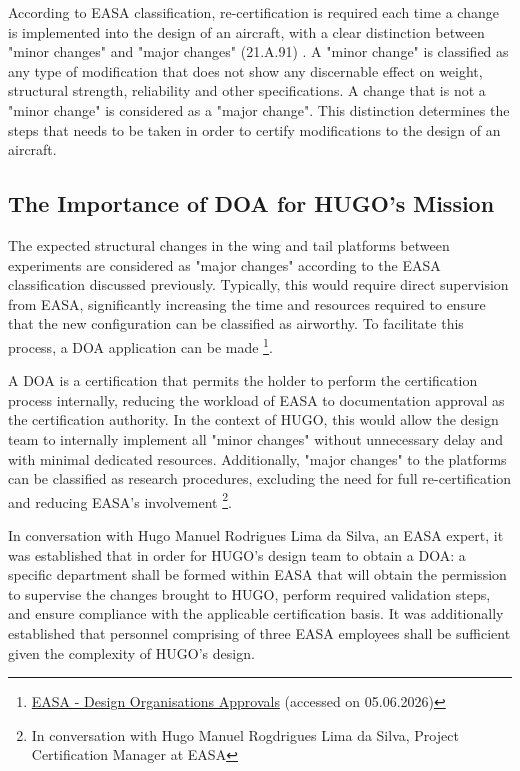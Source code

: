 According to EASA classification, re-certification is required each time a change is implemented into the design of an aircraft, with a clear distinction between "minor changes" and "major changes"
(21.A.91) \cite{EASAInitialAirworthiness2025}. A "minor change" is classified as any type of modification that does not show any discernable effect on weight, structural strength, reliability and other specifications. A change that is not a "minor change" is considered as a "major change". This distinction determines the steps that needs to be taken in order to certify modifications to the design of an aircraft.


\subsection{The Importance of DOA for HUGO's Mission}
The expected structural changes in the wing and tail platforms between experiments are considered as "major changes" according to the EASA classification discussed previously. Typically, this would require direct supervision from EASA, significantly increasing the time and resources required to ensure that the new configuration can be classified as airworthy. To facilitate this process, a DOA application can be made \footnote{\label{DOA_site}\href{https://www.easa.europa.eu/en/domains/aircraft-products/design-organisations/design-organisations-approvals}{EASA - Design Organisations Approvals} (accessed on 05.06.2026)}.

A  DOA is a certification that permits the holder to perform the certification process internally, reducing the workload of EASA to documentation approval as the certification authority. In the context of HUGO, this would allow the design team to internally implement all "minor changes" without unnecessary delay and with minimal dedicated resources. Additionally, "major changes" to the platforms can be classified as research procedures, excluding the need for full re-certification and reducing EASA's involvement \footnote{In conversation with Hugo Manuel Rogdrigues Lima da Silva, Project Certification Manager at EASA}.


In conversation with Hugo Manuel Rodrigues Lima da Silva, an EASA expert, it was established that in order for HUGO's design team to obtain a DOA: a specific department shall be formed within EASA that will obtain the permission to supervise the changes brought to HUGO, perform required validation steps, and ensure compliance with the applicable certification basis. It was additionally established that personnel comprising of three EASA employees shall be sufficient given the complexity of HUGO's design. 

